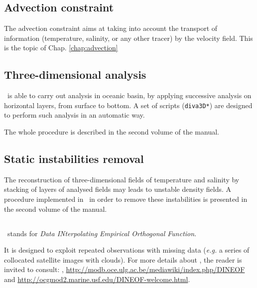  
\subsection{Advection constraint}


The advection constraint aims at taking into account the transport of information (temperature, salinity, or any other tracer) by the velocity field. 
This is the topic of Chap. \ref{chap:advection}


\subsection{Three-dimensional analysis}

\diva\, is able to carry out analysis in oceanic basin, by applying successive analysis on horizontal layers, from surface to bottom. A set of scripts (\texttt{diva3D*}) are designed to perform such analysis in an automatic way.

The whole procedure is described in the second volume of the manual.

\subsection{Static instabilities removal}

The reconstruction of three-dimensional fields of temperature and salinity by stacking of layers of analysed fields may leads to unstable density fields. A procedure implemented in \diva\, in order to remove these instabilities is presented in the second volume of the manual.

\subsection{\dineof\label{lasttool}}

\hypertarget{DINEOF}{\dineof}\, stands for \textit{Data INterpolating Empirical Orthogonal Function}.

It is designed to exploit repeated observations with missing data (\textit{e.g.} a series of collocated satellite images with clouds).
For more details about \dineof, the reader is invited to consult:
\cite{ALVERA05,ALVERA07,BECKERS03,BECKERS06}, \url{http://modb.oce.ulg.ac.be/mediawiki/index.php/DINEOF} and   \url{http://ocgmod2.marine.usf.edu/DINEOF-welcome.html}.



